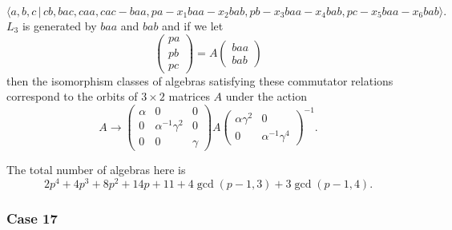 \documentclass[10pt]{article}
\begin{document}
\begin{equation}
\langle
a,b,c\,|%
\,cb,bac,caa,cac-baa,pa-x_{1}baa-x_{2}bab,pb-x_{3}baa-x_{4}bab,pc-x_{5}baa-x_{6}bab\rangle .
\tag{7.772}
\end{equation}%
$L_{3}$ is generated by $baa$ and $bab$ and if we let 
\[
\left( 
\begin{array}{l}
pa \\ 
pb \\ 
pc%
\end{array}%
\right) =A\left( 
\begin{array}{l}
baa \\ 
bab%
\end{array}%
\right) 
\]%
then the isomorphism classes of algebras satisfying these commutator
relations correspond to the orbits of $3\times 2$ matrices $A$ under the
action 
\[
A\rightarrow \left( 
\begin{array}{lll}
\alpha & 0 & 0 \\ 
0 & \alpha ^{-1}\gamma ^{2} & 0 \\ 
0 & 0 & \gamma%
\end{array}%
\right) A\left( 
\begin{array}{ll}
\alpha \gamma ^{2} & 0 \\ 
0 & \alpha ^{-1}\gamma ^{4}%
\end{array}%
\right) ^{-1}. 
\]

The total number of algebras here is 
\[
2p^{4}+4p^{3}+8p^{2}+14p+11+4\gcd (p-1,3)+3\gcd (p-1,4). 
\]

\subsubsection{Case 17}
\end{document}
